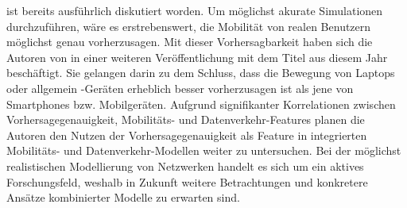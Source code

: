 \documentclass[12pt, a4paper]{article}
\begin{document}
ist bereits ausführlich diskutiert worden. Um möglichst akurate Simulationen durchzuführen, wäre es erstrebenswert,
die Mobilität von realen Benutzern möglichst genau vorherzusagen. Mit dieser Vorhersagbarkeit haben sich die Autoren
von \cite{Alipour2018} in einer weiteren Veröffentlichung mit dem Titel \cite{Alipour2019} aus diesem Jahr beschäftigt.
Sie gelangen darin zu dem Schluss, dass die Bewegung von Laptops oder allgemein -Geräten
erheblich besser vorherzusagen ist als jene von Smartphones bzw. Mobilgeräten.
Aufgrund signifikanter Korrelationen zwischen Vorhersagegenauigkeit, Mobilitäts- und Datenverkehr-Features
planen die Autoren den Nutzen der Vorhersagegenauigkeit als Feature in integrierten Mobilitäts- und Datenverkehr-Modellen
weiter zu untersuchen.\newline
Bei der möglichst realistischen Modellierung von Netzwerken handelt es sich um ein aktives Forschungsfeld,
weshalb in Zukunft weitere Betrachtungen und konkretere Ansätze kombinierter Modelle zu erwarten sind.

\vfill
\pagebreak


%


\vfill
\pagebreak
\end{document}
